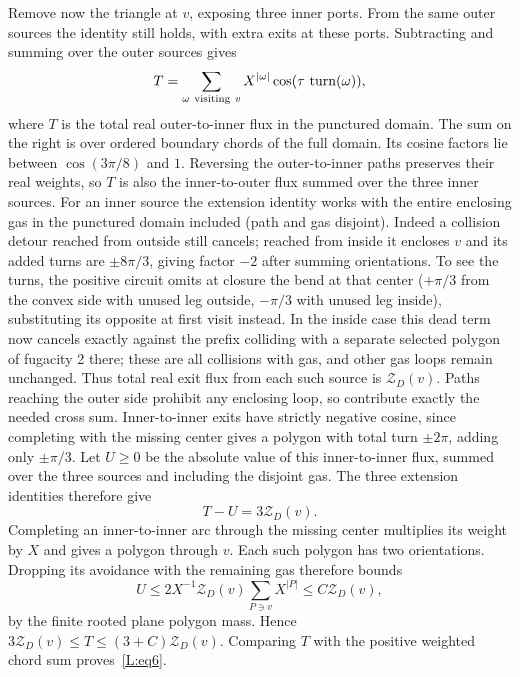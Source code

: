 Remove now the triangle at \(v\), exposing three inner ports. From the same outer sources the identity still holds, with extra exits at these ports. Subtracting and summing over the outer sources gives
\[
 T=\sum_{\omega\ {\rm visiting}\ v}
        X^{|\omega|}\cos(\tau\,\operatorname{turn}(\omega)),
\]
where $T$ is the total real outer-to-inner flux in the punctured domain.
The sum on the right is over ordered boundary chords of the full domain.
Its cosine factors lie between $\cos(3\pi/8)$ and $1$. Reversing the
outer-to-inner paths preserves their real weights, so $T$ is also the
inner-to-outer flux summed over the three inner sources. For an inner source the extension identity works with the entire enclosing gas in the punctured domain included (path and gas disjoint). Indeed a collision detour reached from outside still cancels; reached from inside it encloses \(v\) and its added turns are \(\pm8\pi/3\), giving factor \(-2\) after summing orientations. To see the turns, the positive circuit omits at closure the bend at that center (\(+\pi/3\) from the convex side with unused leg outside, \(-\pi/3\) with unused leg inside), substituting its opposite at first visit instead. In the inside case this dead term now cancels exactly against the prefix colliding with a separate selected polygon of fugacity 2 there; these are all collisions with gas, and other gas loops remain unchanged. Thus total real exit flux from each such source is \(\mathcal Z_D(v)\). Paths reaching the outer side prohibit any enclosing loop, so contribute exactly the needed cross sum. Inner-to-inner exits have strictly negative cosine, since completing with the missing center gives a polygon with total turn \(\pm2\pi\), adding only \(\pm\pi/3\). Let $U\ge0$ be the absolute value of this inner-to-inner flux,
summed over the three sources and including the disjoint gas. The three
extension identities therefore give
\[
                         T-U=3\mathcal Z_D(v).
\]
Completing an inner-to-inner arc through the missing center multiplies
its weight by $X$ and gives a polygon through $v$. Each such polygon
has two orientations. Dropping its avoidance with the remaining gas
therefore bounds
\[
 U\le 2X^{-1}\mathcal Z_D(v)
                   \sum_{P\ni v}X^{|P|}
   \le C\mathcal Z_D(v),
\]
by the finite rooted plane polygon mass. Hence
$3\mathcal Z_D(v)\le T\le(3+C)\mathcal Z_D(v)$. Comparing $T$ with the
positive weighted chord sum proves~\eqref{L:eq6}.

